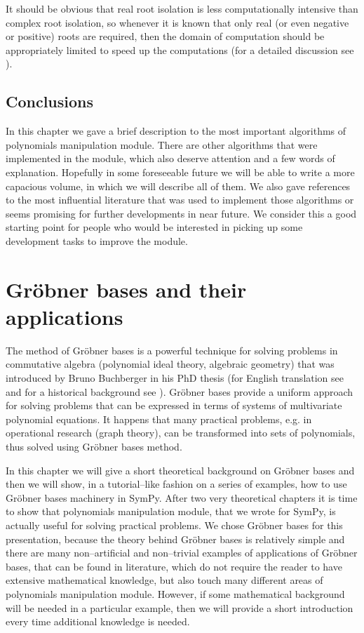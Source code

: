 It should be obvious that real root isolation is less computationally intensive than complex
root isolation, so whenever it is known that only real (or even negative or positive) roots
are required, then the domain of computation should be appropriately limited to speed up the
computations (for a detailed discussion see \cite{Collins1996complex}).


\section{Conclusions}

In this chapter we gave a brief description to the most important algorithms of polynomials
manipulation module. There are other algorithms that were implemented in the module, which
also deserve attention and a few words of explanation. Hopefully in some foreseeable future
we will be able to write a more capacious volume, in which we will describe all of them. We
also gave references to the most influential literature that was used to implement those
algorithms or seems promising for further developments in near future. We consider this a
good starting point for people who would be interested in picking up some development tasks
to improve the module.



\chapter{Gröbner bases and their applications}\label{thesis-groebner}

The method of Gröbner bases is a powerful technique for solving problems in commutative
algebra (polynomial ideal theory, algebraic geometry) that was introduced by Bruno Buchberger
in his PhD thesis \cite{Buchberger1965thesis} (for English translation see \cite{Abramson2006translation}
and for a historical background see \cite{Abramson2009history}). Gröbner bases provide a uniform
approach for solving problems that can be expressed in terms of systems of multivariate polynomial
equations. It happens that many practical problems, e.g.  in operational research (graph theory),
can be transformed into sets of polynomials, thus solved using Gröbner bases method.

In this chapter we will give a short theoretical background on Gröbner bases and then we will
show, in a tutorial--like fashion on a series of examples, how to use Gröbner bases machinery
in SymPy. After two very theoretical chapters it is time to show that polynomials manipulation
module, that we wrote for SymPy, is actually useful for solving practical problems. We chose
Gröbner bases for this presentation, because the theory behind Gröbner bases is relatively
simple and there are many non--artificial and non--trivial examples of applications of Gröbner
bases, that can be found in literature, which do not require the reader to have extensive mathematical
knowledge, but also touch many different areas of polynomials manipulation module. However, if some
mathematical background will be needed in a particular example, then we will provide a short introduction
every time additional knowledge is needed.


